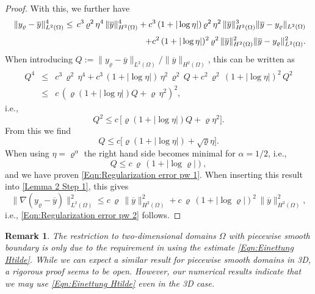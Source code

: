 \documentclass{article}
\newtheorem{remark}{Remark}
\numberwithin{equation}{section}
\begin{document}
\begin{proof}
  With this, we further have
   \begin{eqnarray*}
     && \hspace*{-7mm} \| y_\varrho - \overline{y} \|^4_{L^2(\Omega)}
     \leq \, c^3 \, \varrho^2 \, \eta^4 \, \| \overline{y} \|_{H^2(\Omega)}^4 +
              c^3 \, (1+|\log \eta|) \, \varrho^2 \, \eta^2 \,
              \| \overline{y} \|^3_{H^2(\Omega)}
              \| \overline{y} - y_\varrho \|_{L^2(\Omega)} \\[1mm]
     && \hspace*{5.2cm} +
        c^2 \, (1+|\log \eta|)^2 \, \varrho^2 \,
        \| \overline{y} \|_{H^2(\Omega)}^2
        \| \overline{y} - y_\varrho \|_{L^2(\Omega)}^2 .
  \end{eqnarray*}
  When introducing
  $Q := \| y_\varrho - \overline{y} \|_{L^2(\Omega)}/\|
  \overline{y} \|_{H^2(\Omega)}$, this can be written as
  \begin{eqnarray*}
    Q^4
    & \leq & c^3 \, \varrho^2 \, \eta^4 +
             c^3 \, (1+|\log \eta|) \, \eta^2 \, \varrho^2 \, Q +
             c^2 \, \varrho^2 \, (1+|\log \eta|)^2 \, Q^2 \\
    & \leq & c \, ( \varrho (1+|\log \eta|) Q + \varrho \, \eta^2)^2,
  \end{eqnarray*}
  i.e.,
  \[
    Q^2 \leq c \, \Big[ \varrho (1+|\log \eta|) Q + \varrho \eta^2 \Big] . 
  \]
  From this we find
  \[
    Q \leq c \Big[ \varrho (1+|\log \eta|) + \sqrt{\varrho} \eta\Big].
  \]
  When using $\eta = \varrho^\alpha$ the right hand side becomes minimal
  for $\alpha = 1/2$, i.e.,
  \[
    Q \leq c \, \varrho \, (1+|\log \varrho|) ,
  \]
  and we have proven \eqref{Eqn:Regularization error pw 1}.
  When inserting this result into \eqref{Lemma 2 Step 1}, this gives
  \[
    \| \nabla (y_\varrho - \overline{y}) \|^2_{L^2(\Omega)} \leq
    c \, \varrho \, \| \overline{y} \|_{H^2(\Omega)}^2 +
    c \, \varrho \, (1+|\log \varrho|)^2 \, \| \overline{y} \|_{H^2(\Omega)}^2,
  \]
  i.e., \eqref{Eqn:Regularization error pw 2} follows. 
\end{proof}

\begin{remark}
  The restriction to two-dimensional domains $\Omega$ with piecewise smooth
  boundary is only due to the requirement in using the estimate
  \eqref{Eqn:Einettung Htilde}. While we can expect
  a similar result for piecewise smooth domains in 3D, a rigorous proof
  seems to be open. However, our numerical results indicate that we
  may use \eqref{Eqn:Einettung Htilde} even in the 3D case.
\end{remark}
\end{document}
